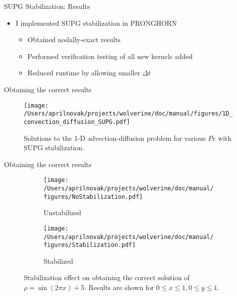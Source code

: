 \documentclass{beamer}
\begin{document}

\begin{frame}{SUPG Stabilization: Results}

\begin{itemize}
\item I implemented SUPG stabilization in PRONGHORN
	\begin{itemize}
		\item Obtained nodally-exact results
		\item Performed verification testing of all new kernels added
		\item Reduced runtime by allowing smaller \(\Delta t\)
	\end{itemize}
\end{itemize}

\end{frame}


\begin{frame}{Obtaining the correct results}

\begin{figure}[H]
  \centering
  \texttt{[image: /Users/aprilnovak/projects/wolverine/doc/manual/figures/1D\_convection\_diffusion\_SUPG.pdf]}
  \caption{Solutions to the 1-D advection-diffusion problem for various \(Pe\) with SUPG stabilization.}
\end{figure}

\end{frame}


\begin{frame}{Obtaining the correct results}

\begin{figure}[H]
\centering
\begin{subfigure}{.425\textwidth}
  \centering
  \texttt{[image: /Users/aprilnovak/projects/wolverine/doc/manual/figures/NoStabilization.pdf]}
  \caption{Unstabilized}
\end{subfigure}
\begin{subfigure}{.425\textwidth}
  \centering
  \texttt{[image: /Users/aprilnovak/projects/wolverine/doc/manual/figures/Stabilization.pdf]}
  \caption{Stabilized}
\end{subfigure}
\caption{Stabilization effect on obtaining the correct solution of \(\rho=\sin{(2\pi x)}+5\). Results are shown for \(0\leq x\leq 1, 0\leq y\leq 1\).}
\end{figure}

\end{frame}
\end{document}
